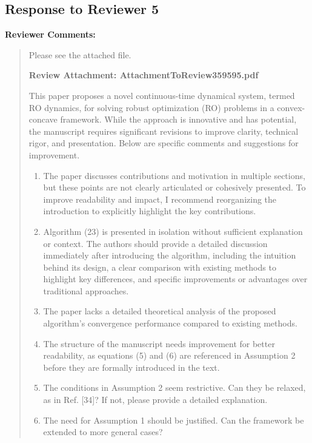 \documentclass[journal,twoside,web]{ieeecolor}
\begin{document}
\newpage 
\subsection*{Response to Reviewer 5}

\noindent\textbf{Reviewer Comments:}

\begin{quote}
Please see the attached file.

\textbf{Review Attachment: AttachmentToReview359595.pdf}

This paper proposes a novel continuous-time dynamical system, termed RO dynamics, for solving robust optimization (RO) problems in a convex-concave framework. While the approach is innovative and has potential, the manuscript requires significant revisions to improve clarity, technical rigor, and presentation. Below are specific comments and suggestions for improvement.

\begin{enumerate}
\item The paper discusses contributions and motivation in multiple sections, but these points are not clearly articulated or cohesively presented. To improve readability and impact, I recommend reorganizing the introduction to explicitly highlight the key contributions.

\item Algorithm (23) is presented in isolation without sufficient explanation or context. The authors should provide a detailed discussion immediately after introducing the algorithm, including the intuition behind its design, a clear comparison with existing methods to highlight key differences, and specific improvements or advantages over traditional approaches.

\item The paper lacks a detailed theoretical analysis of the proposed algorithm's convergence performance compared to existing methods.

\item The structure of the manuscript needs improvement for better readability, as equations (5) and (6) are referenced in Assumption 2 before they are formally introduced in the text.

\item The conditions in Assumption 2 seem restrictive. Can they be relaxed, as in Ref. [34]? If not, please provide a detailed explanation.

\item The need for Assumption 1 should be justified. Can the framework be extended to more general cases?


\end{enumerate}
\end{quote}
\end{document}
